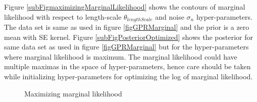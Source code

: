 Figure \ref{subFigmaximizingMarginalLikelihood} shows the contours of marginal likelihood with respect to length-scale $\theta_{lengthScale}$ and noise $\sigma_{n}$ hyper-parameters. The data set is same as used in figure \ref{figGPRMarginal} and the prior is a zero mean with SE kernel. Figure \ref{subFigPosteriorOptimized} shows the posterior for same data set as used in figure \ref{figGPRMarginal} but for the hyper-parameters where marginal likelihood is maximum. The marginal likelihood could have multiple maximas in the space of hyper-parameters, hence care should be taken while initializing hyper-parameters for optimizing the log of marginal likelihood. 

  \begin{figure}[!ht]
  \centering
    \quad
  \quad
       \caption{Maximizing marginal likelihood}\label{figGPRMarginalOptimized}
\end{figure}

